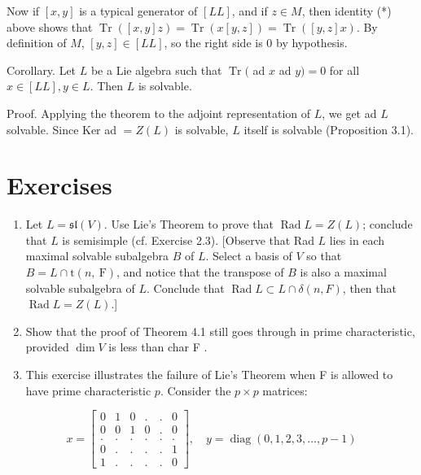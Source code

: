 \documentclass[10pt]{article}
\begin{document}
Now if $[x, y]$ is a typical generator of $[L L]$, and if $z \in M$, then identity (*) above shows that $\operatorname{Tr}([x, y] z)=\operatorname{Tr}(x[y, z])=\operatorname{Tr}([y, z] x)$. By definition of $M$, $[y, z] \in[L L]$, so the right side is 0 by hypothesis.

Corollary. Let $L$ be a Lie algebra such that $\operatorname{Tr}($ ad $x$ ad $y)=0$ for all $x \in[L L], y \in L$. Then $L$ is solvable.

Proof. Applying the theorem to the adjoint representation of $L$, we get ad $L$ solvable. Since Ker ad $=Z(L)$ is solvable, $L$ itself is solvable (Proposition 3.1).

\section*{Exercises}
\begin{enumerate}
  \item Let $L=\mathfrak{s l}(V)$. Use Lie's Theorem to prove that $\operatorname{Rad} L=Z(L)$; conclude that $L$ is semisimple (cf. Exercise 2.3). [Observe that Rad $L$ lies in each maximal solvable subalgebra $B$ of $L$. Select a basis of $V$ so that $B=L \cap \mathrm{t}(n, \mathrm{~F})$, and notice that the transpose of $B$ is also a maximal solvable subalgebra of $L$. Conclude that $\operatorname{Rad} L \subset L \cap \delta(n, F)$, then that $\operatorname{Rad} L=Z(L)$.]
  \item Show that the proof of Theorem 4.1 still goes through in prime characteristic, provided $\operatorname{dim} V$ is less than char F .
  \item This exercise illustrates the failure of Lie's Theorem when F is allowed to have prime characteristic $p$. Consider the $p \times p$ matrices:
\end{enumerate}

$$
x=\left[\begin{array}{cccccc}
0 & 1 & 0 & . & . & 0 \\
0 & 0 & 1 & 0 & . & 0 \\
. & . & . & . & . & . \\
0 & . & . & . & . & 1 \\
1 & . & . & . & . & 0
\end{array}\right], \quad y=\operatorname{diag}(0,1,2,3, \ldots, p-1)
$$
\end{document}
